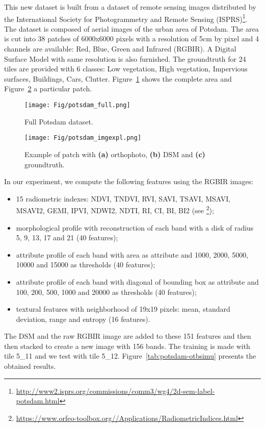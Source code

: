 \documentclass[a4paper,11pt,DIV=16,abstracton]{scrartcl}
\begin{document}
    This new dataset is built from a dataset of remote sensing images distributed by the International Society for Photogrammetry and Remote Sensing (ISPRS)\footnote{\url{http://www2.isprs.org/commissions/comm3/wg4/2d-sem-label-potsdam.html}}. The dataset is composed of aerial images of the urban area of Potsdam. The area is cut into 38 patches of 6000x6000 pixels with a resolution of 5cm by pixel and 4 channels are available: Red, Blue, Green and Infrared (RGBIR). A Digital Surface Model with same resolution is also furnished. The groundtruth for 24 tiles are provided with 6 classes: Low vegetation, High vegetation, Impervious surfaces, Buildings, Cars, Clutter. Figure~\ref{fig:potsdam-dataset} shows the complete area and Figure~\ref{fig:potsdam-expl} a particular patch.

    \begin{figure}[!ht]
        \centering
        \texttt{[image: Fig/potsdam\_full.png]}
        \caption{Full Potsdam dataset.\label{fig:potsdam-dataset}}
    \end{figure}

    \begin{figure}[!ht]
        \centering
        \texttt{[image: Fig/potsdam\_imgexpl.png]}
        \caption{Example of patch with {\bfseries{(a)}} orthophoto, {\bfseries{(b)}} DSM and {\bfseries{(c)}} groundtruth.\label{fig:potsdam-expl}}
    \end{figure}

    In our experiment, we compute the following features using the RGBIR images:
    \begin{itemize}
        \item 15 radiometric indexes: NDVI, TNDVI, RVI, SAVI, TSAVI, MSAVI, MSAVI2, GEMI, IPVI, NDWI2, NDTI, RI, CI, BI, BI2 (see \footnote{\url{https://www.orfeo-toolbox.org//Applications/RadiometricIndices.html}});
        \item morphological profile with reconstruction of each band with a disk of radius 5, 9, 13, 17 and 21 (40 features)\cite{tuia2015multiclass};
        \item attribute profile of each band with area as attribute and 1000, 2000, 5000, 10000 and 15000 as thresholds (40 features)\cite{tuia2015multiclass};
        \item attribute profile of each band with diagonal of bounding box as attribute and 100, 200, 500, 1000 and 20000 as thresholds (40 features)\cite{tuia2015multiclass};
        \item textural features with neighborhood of 19x19 pixels: mean, standard deviation, range and entropy (16 features)\cite{tuia2015multiclass}.
    \end{itemize}
    The DSM and the raw RGBIR image are added to these 151 features and then then stacked to create a new image with 156 bands. The training is made with tile 5\_11 and we test with tile 5\_12. Figure~\ref{tab:potsdam-otbsimu} presents the obtained results.
\end{document}

